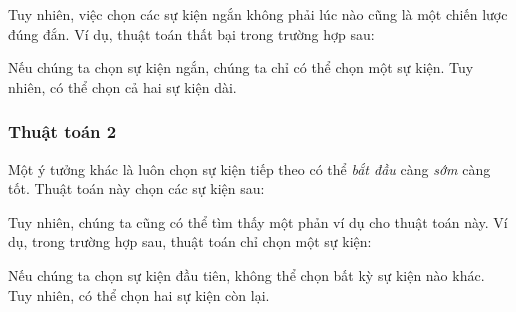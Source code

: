 Tuy nhiên, việc chọn các sự kiện ngắn không phải lúc nào cũng
là một chiến lược đúng đắn. Ví dụ, thuật toán thất bại
trong trường hợp sau:
\begin{center}
\end{center}
Nếu chúng ta chọn sự kiện ngắn, chúng ta chỉ có thể chọn một sự kiện.
Tuy nhiên, có thể chọn cả hai sự kiện dài.

\subsubsection*{Thuật toán 2}

Một ý tưởng khác là luôn chọn sự kiện
tiếp theo có thể \emph{bắt đầu} càng \emph{sớm} càng tốt.
Thuật toán này chọn các sự kiện sau:
\begin{center}
\end{center}

Tuy nhiên, chúng ta cũng có thể tìm thấy một phản ví dụ
cho thuật toán này.
Ví dụ, trong trường hợp sau,
thuật toán chỉ chọn một sự kiện:
\begin{center}
\end{center}
Nếu chúng ta chọn sự kiện đầu tiên, không thể
chọn bất kỳ sự kiện nào khác.
Tuy nhiên, có thể chọn
hai sự kiện còn lại.


